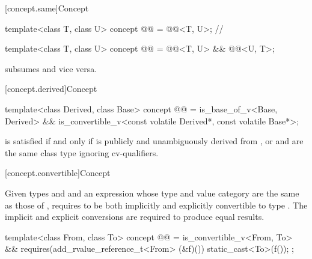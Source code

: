 [concept.same]{Concept }

\begin{itemdecl}
template<class T, class U>
  concept @@ = @@<T, U>;       // \expos

template<class T, class U>
  concept @@ = @@<T, U> && @@<U, T>;
\end{itemdecl}

\begin{itemdescr}
\pnum
\begin{note}
 subsumes  and
vice versa.
\end{note}
\end{itemdescr}

[concept.derived]{Concept }

\begin{itemdecl}
template<class Derived, class Base>
  concept @@ =
    is_base_of_v<Base, Derived> &&
    is_convertible_v<const volatile Derived*, const volatile Base*>;
\end{itemdecl}

\begin{itemdescr}
\pnum
\begin{note}
 is satisfied if and only if
 is publicly and unambiguously derived from , or
 and  are the same class type ignoring cv-qualifiers.
\end{note}
\end{itemdescr}

[concept.convertible]{Concept }

\pnum
Given types  and  and
an expression 
whose type and value category are the same as those of ,
 requires 
to be both implicitly and explicitly convertible to type .
The implicit and explicit conversions are required to produce equal
results.

\begin{itemdecl}
template<class From, class To>
  concept @@ =
    is_convertible_v<From, To> &&
    requires(add_rvalue_reference_t<From> (&f)()) {
      static_cast<To>(f());
    };
\end{itemdecl}


